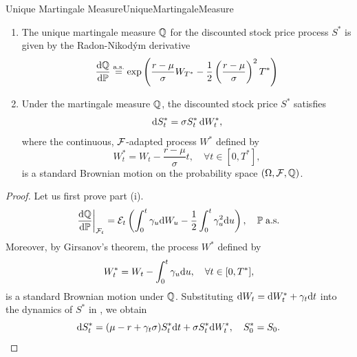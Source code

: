 \begin{lem}{Unique Martingale Measure}{UniqueMartingaleMeasure}
	\begin{enumerate}[label = (\roman*), nosep, wide]
		\item The unique martingale measure \(\mathbb{Q}\) for the discounted stock price process \(S^*\) is given by the Radon-Nikod\'ym derivative
		      \begin{equation}
			      \frac{\mathrm{d} \mathbb{Q}}{\mathrm{d} \mathbb{P}} \overset{\text{a.s.}}{=} \exp \left( \frac{r - \mu}{\sigma} W_{T^*} - \frac{1}{2} \left( \frac{r - \mu}{\sigma} \right)^2 T^* \right)
			      \label{eq:RadonNikodymDerivative}
		      \end{equation}
		\item Under the martingale measure \(\mathbb{Q}\), the discounted stock price \(S^*\) satisfies
		      \begin{equation}
			      \mathrm{d} S^*_t = \sigma S^*_t \, \mathrm{d} W^*_t,
			      \label{eq:DiscountedDynamicsQ}
		      \end{equation}
		      where the continuous, \(\mathcal{F}\)-adapted process \(W^*\) defined by
		      \begin{equation}
			      W^*_t = W_t - \frac{r - \mu}{\sigma} t, \quad \forall t \in [0, T^*],
			      \label{eq:GirsanovBrownianMotion}
		      \end{equation}
		      is a standard Brownian motion on the probability space \((\Omega, \mathcal{F}, \mathbb{Q})\).
	\end{enumerate}
\end{lem}

\begin{proof}
	Let us first prove part (i).
	\begin{equation*}
		\frac{\mathrm{d} \mathbb{Q}}{\mathrm{d} \mathbb{P}}\bigg|_{\mathcal{F}_t} = \mathcal{E}_t\left( \int_0^t \gamma_u \mathrm{d} W_u - \frac{1}{2} \int_0^t \gamma_u^2 \mathrm{d} u \right), \quad \mathbb{P} \; \text{a.s.}
	\end{equation*}
	Moreover, by Girsanov's theorem, the process \(W^*\) defined by
	\begin{equation*}
		W^*_t = W_t - \int_0^t \gamma_u \mathrm{d} u, \quad \forall t \in [0, T^*],
	\end{equation*}
	is a standard Brownian motion under \(\mathbb{Q}\).
	Substituting \(\mathrm{d} W_t = \mathrm{d} W^*_t + \gamma_t \mathrm{d} t\) into the dynamics of \(S^*\) in , we obtain
	\begin{equation*}
		\mathrm{d} S^*_t = (\mu - r + \gamma_t \sigma) S^*_t \mathrm{d} t + \sigma S^*_t \mathrm{d} W^*_t, \quad S_0^*=S_0.
	\end{equation*}
\end{proof}

